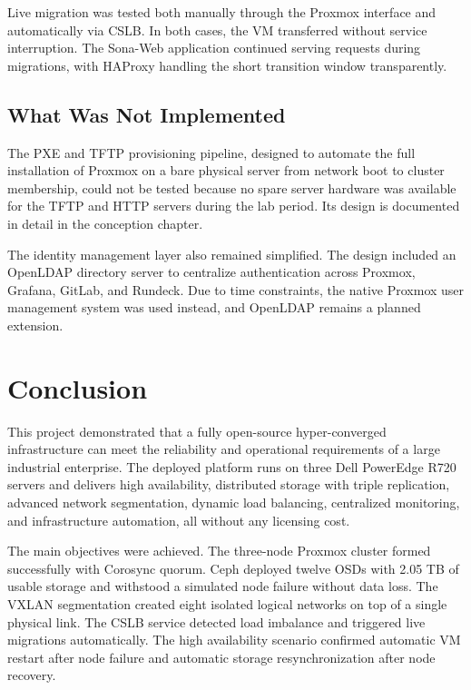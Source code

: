 \documentclass[12pt, a4paper]{article}
\begin{document}
Live migration was tested both manually through the Proxmox interface and automatically via CSLB. In both cases, the VM transferred without service interruption. The Sona-Web application continued serving requests during migrations, with HAProxy handling the short transition window transparently.

\subsection{What Was Not Implemented}

The PXE and TFTP provisioning pipeline, designed to automate the full installation of Proxmox on a bare physical server from network boot to cluster membership, could not be tested because no spare server hardware was available for the TFTP and HTTP servers during the lab period. Its design is documented in detail in the conception chapter.

The identity management layer also remained simplified. The design included an OpenLDAP directory server to centralize authentication across Proxmox, Grafana, GitLab, and Rundeck. Due to time constraints, the native Proxmox user management system was used instead, and OpenLDAP remains a planned extension.

\section*{Conclusion}

This project demonstrated that a fully open-source hyper-converged infrastructure can meet the reliability and operational requirements of a large industrial enterprise. The deployed platform runs on three Dell PowerEdge R720 servers and delivers high availability, distributed storage with triple replication, advanced network segmentation, dynamic load balancing, centralized monitoring, and infrastructure automation, all without any licensing cost.

The main objectives were achieved. The three-node Proxmox cluster formed successfully with Corosync quorum. Ceph deployed twelve OSDs with 2.05 TB of usable storage and withstood a simulated node failure without data loss. The VXLAN segmentation created eight isolated logical networks on top of a single physical link. The CSLB service detected load imbalance and triggered live migrations automatically. The high availability scenario confirmed automatic VM restart after node failure and automatic storage resynchronization after node recovery.
\end{document}
